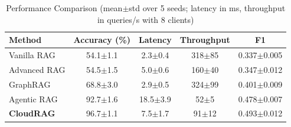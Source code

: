 \begin{table}[!htbp]
\centering
\caption{Performance Comparison (mean$\pm$std over 5 seeds; latency in ms, throughput in queries/s with 8 clients)}
\label{tab:performance}
\footnotesize
\begin{tabular*}{\columnwidth}{@{\extracolsep{\fill}}lcccc@{}}
\toprule
Method & Accuracy (\%) & Latency & Throughput & F1 \\
\midrule
Vanilla RAG & 54.1$\pm$1.1 & 2.3$\pm$0.4 & 318$\pm$85 & 0.337$\pm$0.005 \\
Advanced RAG & 54.5$\pm$1.5 & 5.0$\pm$0.6 & 160$\pm$40 & 0.347$\pm$0.012 \\
GraphRAG & 68.8$\pm$3.0 & 2.9$\pm$0.5 & 324$\pm$99 & 0.401$\pm$0.009 \\
Agentic RAG & 92.7$\pm$1.6 & 18.5$\pm$3.9 & 52$\pm$5 & 0.478$\pm$0.007 \\
\textbf{CloudRAG} & 96.7$\pm$1.1 & 7.5$\pm$1.7 & 91$\pm$12 & 0.493$\pm$0.012 \\
\bottomrule
\end{tabular*}
\end{table}
